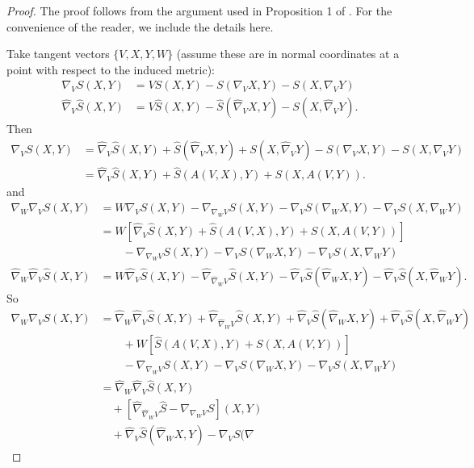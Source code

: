 \documentclass[12pt,letterpaper]{amsart}%
\numberwithin{mycounter}{section}
\theoremstyle{plain}
\numberwithin{equation}{section}
\theoremstyle{definition}
\begin{document}
\begin{proof}
The proof follows from the argument used in Proposition 1 of \cite{BLMR}. For
the convenience of the reader, we include the details here.

Take tangent vectors $\{V,X,Y,W\}$ (assume these are in normal coordinates at
a point with respect to the induced metric):
\begin{align*}
\nabla_{V}S(X,Y) &  =VS(X,Y)-S(\nabla_{V}X,Y)-S(X,\nabla_{V}Y)\\
\hat{\nabla}_{V}\hat{S}(X,Y) &  =V\hat{S}(X,Y)-\hat{S}(\hat{\nabla}%
_{V}X,Y)-S(X,\hat{\nabla}_{V}Y).
\end{align*}
Then
\begin{align*}
\nabla_{V}S(X,Y) &  =\hat{\nabla}_{V}\hat{S}(X,Y)+\hat{S}(\hat{\nabla}%
_{V}X,Y)+S(X,\hat{\nabla}_{V}Y)-S(\nabla_{V}X,Y)-S(X,\nabla_{V}Y)\\
&  =\hat{\nabla}_{V}\hat{S}(X,Y)+\hat{S}(A(V,X),Y)+S(X,A(V,Y)).
\end{align*}
and
\begin{align*}
\nabla_{W}\nabla_{V}S(X,Y) &  =W\nabla_{V}S(X,Y)-\nabla_{\nabla_{W}%
V}S(X,Y)-\nabla_{V}S(\nabla_{W}X,Y)-\nabla_{V}S(X,\nabla_{W}Y)\\
&  =W\left[  \hat{\nabla}_{V}\hat{S}(X,Y)+\hat{S}%
(A(V,X),Y)+S(X,A(V,Y))\right]  \\
&  \qquad-\nabla_{\nabla_{W}V}S(X,Y)-\nabla_{V}S(\nabla_{W}X,Y)-\nabla
_{V}S(X,\nabla_{W}Y)\\
\hat{\nabla}_{W}\hat{\nabla}_{V}\hat{S}(X,Y) &  =W\hat{\nabla}_{V}\hat
{S}(X,Y)-\hat{\nabla}_{\hat{\nabla}_{W}V}\hat{S}(X,Y)-\hat{\nabla}_{V}\hat
{S}(\hat{\nabla}_{W}X,Y)-\hat{\nabla}_{V}\hat{S}(X,\hat{\nabla}_{W}Y).
\end{align*}
So
\begin{align*}
\nabla_{W}\nabla_{V}S(X,Y) &  =\hat{\nabla}_{W}\hat{\nabla}_{V}\hat
{S}(X,Y)+\hat{\nabla}_{\hat{\nabla}_{W}V}\hat{S}(X,Y)+\hat{\nabla}_{V}\hat
{S}(\hat{\nabla}_{W}X,Y)+\hat{\nabla}_{V}\hat{S}(X,\hat{\nabla}_{W}Y)\\
&  \qquad+W\left[  \hat{S}(A(V,X),Y)+S(X,A(V,Y))\right]  \\
&  \qquad-\nabla_{\nabla_{W}V}S(X,Y)-\nabla_{V}S(\nabla_{W}X,Y)-\nabla
_{V}S(X,\nabla_{W}Y)\\
&  =\hat{\nabla}_{W}\hat{\nabla}_{V}\hat{S}(X,Y)\\
&  \quad+\left[  \hat{\nabla}_{\hat{\nabla}_{W}V}\hat{S}-\nabla_{\nabla_{W}%
V}S\right]  (X,Y)\\
&  \quad+\hat{\nabla}_{V}\hat{S}(\hat{\nabla}_{W}X,Y)-\nabla_{V}S(\nabla

\end{align*}
\end{proof}
\end{document}

